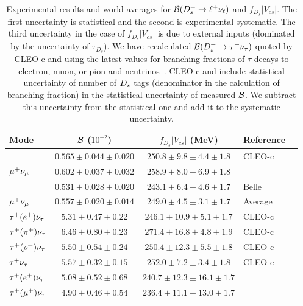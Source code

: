 \begin{table}[t!]
\caption{Experimental results and world averages for ${\cal{B}}(D_{s}^+\to\ell^+\nu_{\ell})$ and $f_{D_s}|V_{cs}|$.
The first uncertainty is statistical and the second is experimental systematic. The third uncertainty 
in the case of $f_{D_s}|V_{cs}|$ is due to external inputs (dominated by the uncertainty of $\tau_{D_s}$).
We have recalculated ${\cal B}(D_{s}^+\to\tau^+\nu_{\tau})$ quoted by CLEO-c and \babar using the latest 
values for branching fractions of $\tau$ decays to electron, muon, or pion and neutrinos~\cite{PDG_2012}.
CLEO-c and \babar include statistical uncertainty of number of $D_{s}$ tags (denominator in the calculation of 
branching fraction) in the statistical uncertainty of measured ${\cal B}$. We subtract this uncertainty from the
statistical one and add it to the systematic uncertainty. 
\label{tab:DsLeptonic}}
\begin{center}
\begin{tabular}{lccll}
\toprule
\rowcolor{Gray}
Mode 		& ${\cal{B}}$ ($10^{-2}$) 	& $f_{D_s}|V_{cs}|$ (MeV) 		& Reference & 
\\ \midrule
\multirow{3}{*}{$\mu^+\nu_{\mu}$}	& $0.565\pm0.044\pm 0.020$ 	& $250.8 \pm 9.8 \pm 4.4 \pm 1.8$	& CLEO-c &\cite{Alexander:2009ux}\\		
				& $0.602\pm0.037\pm 0.032$ 	& $258.9 \pm 8.0 \pm 6.9 \pm 1.8$	& \babar  &\cite{delAmoSanchez:2010jg}\\
				& $0.531\pm0.028\pm 0.020$ 	& $243.1 \pm 6.4 \pm 4.6 \pm 1.7$ 	& Belle  &\cite{Zupanc:2013byn}\\
\midrule
\rowcolor{Gray}
$\mu^+\nu_{\mu}$ 			& $0.557\pm0.020\pm0.014$ 		& $249.0 \pm 4.5 \pm 3.1 \pm 1.7$ 	& Average & \\
\midrule
$\tau^+(e^+)\nu_{\tau}$ 			& $5.31\pm0.47\pm0.22$ 		& $246.1 \pm 10.9 \pm 5.1 \pm 1.7$ 	& CLEO-c &\cite{Onyisi:2009th}\\
$\tau^+(\pi^+)\nu_{\tau}$ 			& $6.46\pm0.80\pm0.23$ 		& $271.4 \pm 16.8 \pm 4.8 \pm 1.9$  & CLEO-c &\cite{Alexander:2009ux}\\
$\tau^+(\rho^+)\nu_{\tau}$ 			& $5.50\pm0.54\pm0.24$ 		& $250.4 \pm 12.3 \pm 5.5 \pm 1.8$  & CLEO-c &\cite{Naik:2009tk}\\
\midrule
\rowcolor{LightGray}
$\tau^+\nu_{\tau}$			& $5.57\pm0.32\pm0.15$		& $252.0 \pm 7.2 \pm 3.4 \pm 1.8$   & CLEO-c & \\
\midrule
$\tau^+(e^+)\nu_{\tau}$ 			& $5.08\pm0.52\pm0.68$ 		& $240.7 \pm 12.3 \pm 16.1 \pm 1.7$	& \multirow{2}{*}{\babar} & \multirow{2}{*}{\cite{delAmoSanchez:2010jg}}\\
$\tau^+(\mu^+)\nu_{\tau}$ 			& $4.90\pm0.46\pm0.54$ 		& $236.4 \pm 11.1 \pm 13.0 \pm 1.7$	&  & \\

\end{tabular}
\end{center}
\end{table}
